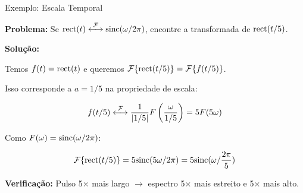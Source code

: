 
\begin{frame}{Exemplo: Escala Temporal}

\textbf{Problema:} Se $\text{rect}(t) \mathrel{\overset{\mathcal{F}}{\longleftrightarrow}} \text{sinc}(\omega/2\pi)$, encontre a transformada de $\text{rect}(t/5)$.

\textbf{Solução:}

Temos $f(t) = \text{rect}(t)$ e queremos $\mathcal{F}\{\text{rect}(t/5)\} = \mathcal{F}\{f(t/5)\}$.

Isso corresponde a $a = 1/5$ na propriedade de escala:

\[
f(t/5) \mathrel{\overset{\mathcal{F}}{\longleftrightarrow}} \frac{1}{|1/5|} F\left(\frac{\omega}{1/5}\right) = 5 F(5\omega)
\]

Como $F(\omega) = \text{sinc}(\omega/2\pi)$:

\[
\mathcal{F}\{\text{rect}(t/5)\} = 5 \text{sinc}(5\omega/2\pi) = 5 \text{sinc}(\omega/\frac{2\pi}{5})
\]

\textbf{Verificação:} Pulso 5× mais largo $\rightarrow$ espectro 5× mais estreito e 5× mais alto.

\end{frame}


